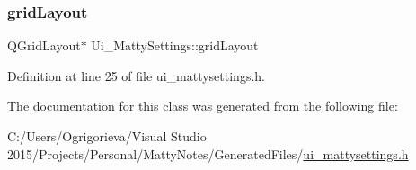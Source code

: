 \subsubsection{\texorpdfstring{grid\+Layout}{gridLayout}}
{\footnotesize\ttfamily Q\+Grid\+Layout$\ast$ Ui\+\_\+\+Matty\+Settings\+::grid\+Layout}



Definition at line 25 of file ui\+\_\+mattysettings.\+h.



The documentation for this class was generated from the following file\+:\begin{DoxyCompactItemize}
\item 
C\+:/\+Users/\+Ogrigorieva/\+Visual Studio 2015/\+Projects/\+Personal/\+Matty\+Notes/\+Generated\+Files/\hyperlink{ui__mattysettings_8h}{ui\+\_\+mattysettings.\+h}\end{DoxyCompactItemize}
